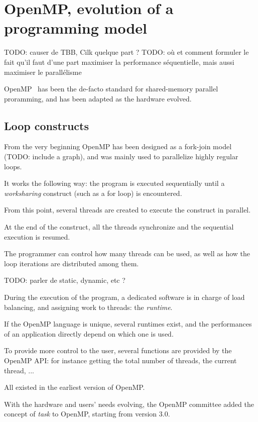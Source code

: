 \section{OpenMP, evolution of a programming model}\label{sec:context:openmp}

TODO: causer de TBB, Cilk quelque part ?
TODO: où et comment formuler le fait qu'il faut d'une part maximiser la performance séquentielle, mais aussi maximiser le parallélisme

OpenMP~\cite{openmp40} has been the de-facto standard for shared-memory parallel proramming, and has been adapted as the hardware evolved.

\subsection{Loop constructs}

From the very beginning OpenMP has been designed as a fork-join model (TODO: include a graph), and was mainly used to parallelize highly regular loops.

It works the following way: the program is executed sequentially until a \emph{worksharing} construct (such as a for loop) is encountered.

From this point, several threads are created to execute the construct in parallel.

At the end of the construct, all the threads synchronize and the sequential execution is resumed.

The programmer can control how many threads can be used, as well as how the loop iterations are distributed among them.

TODO: parler de static, dynamic, etc ?

During the execution of the program, a dedicated software is in charge of load balancing, and assigning work to threads: the \emph{runtime}.

If the OpenMP language is unique, several runtimes exist, and the performances of an application directly depend on which one is used.


To provide more control to the user, several functions are provided by the OpenMP API: for instance getting the total number of threads, the current thread, ...

All existed in the earliest version of OpenMP.

With the hardware and users' needs evolving, the OpenMP committee added the concept of \emph{task} to OpenMP, starting from version 3.0.


